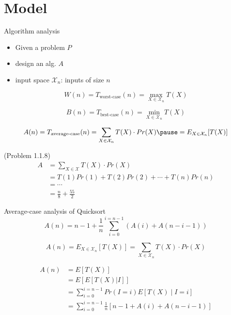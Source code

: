 \section{Model}

\begin{frame}{Algorithm analysis}
  \begin{itemize}
	\item Given a problem $P$
	\item design an alg. $A$
	\item input space $\mathcal{X}_{n}$: inputs of size $n$
  \end{itemize}

  \pause
  \[
	W(n) = T_{\text{worst-case}}(n) = \max_{X \in \mathcal{X}_{n}} T(X)
  \]

  \pause
  \[
	B(n) = T_{\text{best-case}}(n) = \min_{X \in \mathcal{X}_{n}} T(X)
  \]

  \pause
  \[
	A(n) = T_{\text{average-case}}(n) = \sum_{X \in \mathcal{X}_{n}} T(X) \cdot Pr(X) \pause = E_{X \in \mathcal{X}_{n}} [T(X)]
  \]
\end{frame}
\begin{frame}{(Problem 1.1.8)}
  \begin{align*}
	A &= \sum_{X \in \mathcal{X}} T(X) \cdot Pr(X) \\
	  &= T(1) Pr(1) + T(2) Pr(2) + \cdots + T(n) Pr(n) \\
	  &= \cdots  \\
	  &= \frac{n}{8} + \frac{55}{2}
  \end{align*}
\end{frame}
\begin{frame}{Average-case analysis of Quicksort}
  \[
	A(n) = n-1 + \frac{1}{n} \sum_{i=0}^{i=n-1} (A(i) + A(n-i-1))
  \]

  \[
	A(n) = E_{X \in \mathcal{X}_{n}} [T(X)] = \sum_{X \in \mathcal{X}_{n}} T(X) \cdot Pr(X)
  \]

  \pause

  \begin{align*}
	A(n) &= E[T(X)] \\
		&= E[E[T(X)|I]] \\
		&= \sum_{i=0}^{i=n-1} Pr(I = i)E[T(X) \mid I = i] \\
		&= \sum_{i=0}^{i=n-1} \frac{1}{n} [n-1 + A(i) + A(n-i-1)]
  \end{align*}
\end{frame}
